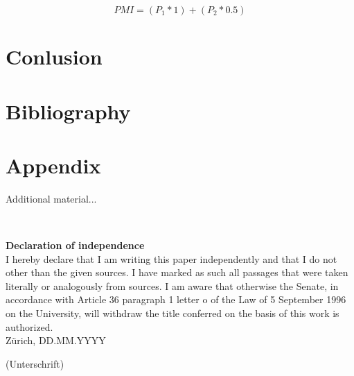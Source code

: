\documentclass[12pt,a4paper]{article}
\begin{document}
\begin{equation}
PMI =(P_{1}*1)+(P_{2}*0.5)
\end{equation}

\section{Conlusion}

\blindtext

\newpage

\section{Bibliography}

\printbibliography

\begin{description}
\item
\end{description}

\vspace{0.8cm}

\newpage
\appendix
\section{Appendix }

Additional material...

\newpage

\thispagestyle{empty}

\ \vspace{1cm}

{\bf \huge Declaration of independence} \\[0.4cm]

I hereby declare that I am writing this paper independently and that I do not
other than the given sources. I have marked as such all passages that were taken literally or analogously from sources. I am aware that otherwise the Senate, in accordance with Article 36 paragraph 1 letter o of the Law of 5 September 1996 on the University, will withdraw the title conferred on the basis of this work
is authorized.\\[0.5cm]

Zürich, DD.MM.YYYY \hspace{5cm} \hrulefill \hspace{1cm} \\[0cm]
\begin{minipage}[h]{15cm} \hspace{10.5cm}  {\small (Unterschrift)}
\end{minipage}
\end{document}
